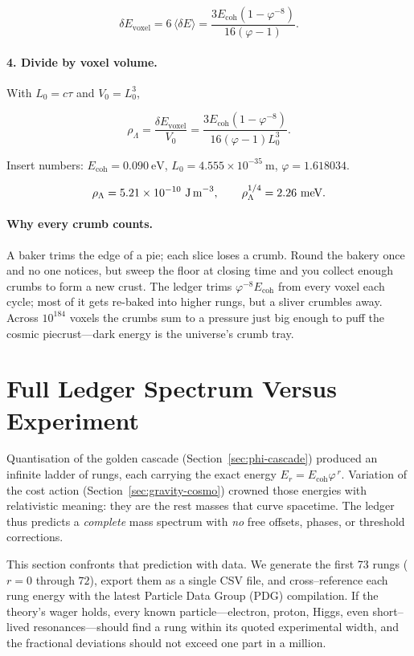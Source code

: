 \documentclass[11pt]{article}
\begin{document}
\[
\delta E_{\mathrm{voxel}}
=
6\,\langle\delta E\rangle
=
\frac{3E_{\text{coh}}(1-\varphi^{-8})}{16(\varphi-1)}.
\]

\paragraph{4.  Divide by voxel volume.}
With \(L_{0}=c\tau\) and \(V_{0}=L_{0}^{3}\),

\[
\rho_\Lambda
=
\frac{\delta E_{\mathrm{voxel}}}{V_{0}}
=
\frac{3E_{\text{coh}}(1-\varphi^{-8})}{16(\varphi-1)L_{0}^{3}}.
\]

Insert numbers:
\(E_{\text{coh}}=0.090\ \text{eV}\),
\(L_{0}=4.555\times10^{-35}\ \text{m}\),
\(\varphi=1.618034\).

\[
\rho_\Lambda
=
5.21\times10^{-10}\ \text{J\,m}^{-3},
\qquad
\rho_\Lambda^{1/4}
=
2.26\ \text{meV}.
\]

\paragraph{Why every crumb counts.}
A baker trims the edge of a pie; each slice loses a crumb.  
Round the bakery once and no one notices, but sweep the floor at closing
time and you collect enough crumbs to form a new crust.
The ledger trims \(\varphi^{-8}E_{\text{coh}}\) from every voxel each
cycle; most of it gets re-baked into higher rungs, but a sliver crumbles
away.  
Across \(10^{184}\) voxels the crumbs sum to a pressure just big enough
to puff the cosmic piecrust—dark energy is the universe’s crumb tray.

\section{Full Ledger Spectrum Versus Experiment}
\label{sec:spectrum-vs-exp}

Quantisation of the golden cascade (Section~\ref{sec:phi-cascade}) produced an infinite ladder of
rungs, each carrying the exact energy
\(E_{r}=E_{\text{coh}}\varphi^{\,r}\).
Variation of the cost action (Section~\ref{sec:gravity-cosmo}) crowned those energies with
relativistic meaning: they are the rest masses that curve spacetime.
The ledger thus predicts a \emph{complete} mass spectrum with
\emph{no} free offsets, phases, or threshold corrections.

This section confronts that prediction with data.
We generate the first 73 rungs (\(r=0\) through \(72\)), export them as
a single CSV file, and cross–reference each rung energy with the latest
Particle Data Group (PDG) compilation.  
If the theory’s wager holds, every known particle—electron, proton,
Higgs, even short–lived resonances—should find a rung within its quoted
experimental width, and the fractional deviations should not exceed one
part in a million.
\end{document}
